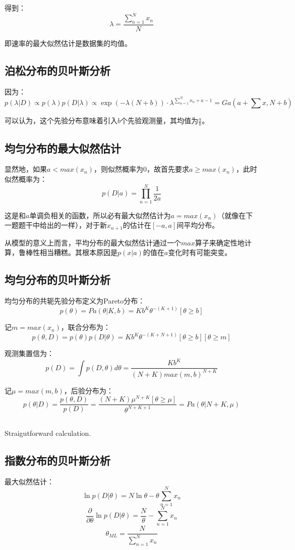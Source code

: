 \documentclass[UTF8]{ctexart}
\begin{document}
得到：
$$\lambda = \frac{\sum_{n=1}^{N}x_{n}}{N}$$

即速率的最大似然估计是数据集的均值。

\subsection{泊松分布的贝叶斯分析}
因为：
$$p(\lambda|D)\propto p(\lambda)p(D|\lambda) \propto \exp(-\lambda(N+b)) \cdot \lambda^{\sum_{n=1}^{N}x_{n}+a-1} = Ga(a+\sum x, N+b)$$

可以认为，这个先验分布意味着引入$b$个先验观测量，其均值为$\frac{a}{b}$。

\subsection{均匀分布的最大似然估计}
显然地，如果$a < max(x_{n})$，则似然概率为0，故首先要求$a \geq max(x_{n})$，此时似然概率为：
$$p(D|a)=\prod_{n=1}^{N}\frac{1}{2a}$$

这是和$a$单调负相关的函数，所以必有最大似然估计为$a = max(x_{n})$（就像在下一题题干中给出的一样），对于新$x_{n+1}$的估计在$[-a,a]$间平均分布。

从模型的意义上而言，平均分布的最大似然估计通过一个$max$算子来确定性地计算，鲁棒性相当糟糕。其根本原因是$p(x|a)$的值在$a$变化时有可能突变。

\subsection{均匀分布的贝叶斯分析}
均匀分布的共轭先验分布定义为Pareto分布：
$$p(\theta)=Pa(\theta|K,b)=Kb^{K}\theta^{-(K+1)}[\theta \geq b]$$

记$m=max(x_{n})$，联合分布为：
$$p(\theta,D) = p(\theta)p(D|\theta) = Kb^{K}\theta^{-(K+N+1)}[\theta \geq b][\theta \geq m]$$

观测集置信为：
$$p(D)=\int p(D,\theta) d\theta=\frac{Kb^{K}}{(N+K)max(m,b)^{N+K}}$$

记$\mu = max(m,b)$，后验分布为：
$$p(\theta|D)= \frac{p(\theta,D)}{p(D)} =\frac{(N+K)\mu^{N+K}[\theta \geq \mu]}{\theta^{N+K+1}}=Pa(\theta|N+K,\mu)$$

\subsection{}
Straigutforward calculation.

\subsection{指数分布的贝叶斯分析}
最大似然估计：
$$\ln p(D|\theta) = N\ln \theta - \theta \sum_{n=1}^{N}x_{n}$$
$$\frac{\partial}{\partial \theta} \ln p(D|\theta) = \frac{N}{\theta} - \sum_{n=1}^{N}x_{n}$$
$$\theta_{ML} = \frac{N}{\sum_{n=1}^{N}x_{n}}$$
\end{document}
